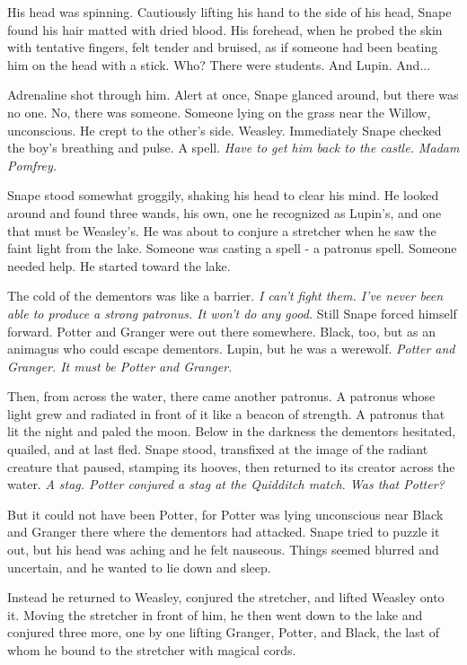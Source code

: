 His head was spinning. Cautiously lifting his hand to the side of his head, Snape found his hair matted with dried blood. His forehead, when he probed the skin with tentative fingers, felt tender and bruised, as if someone had been beating him on the head with a stick. Who? There were students. And Lupin. And...

Adrenaline shot through him. Alert at once, Snape glanced around, but there was no one. No, there was someone. Someone lying on the grass near the Willow, unconscious. He crept to the other's side. Weasley. Immediately Snape checked the boy's breathing and pulse. A spell. \emph{Have to get him back to the castle. Madam Pomfrey.}

Snape stood somewhat groggily, shaking his head to clear his mind. He looked around and found three wands, his own, one he recognized as Lupin's, and one that must be Weasley's. He was about to conjure a stretcher when he saw the faint light from the lake. Someone was casting a spell - a patronus spell. Someone needed help. He started toward the lake.

The cold of the dementors was like a barrier. \emph{I can't fight them. I've never been able to produce a strong patronus. It won't do any good.} Still Snape forced himself forward. Potter and Granger were out there somewhere. Black, too, but as an animagus who could escape dementors. Lupin, but he was a werewolf. \emph{Potter and Granger. It must be Potter and Granger.}

Then, from across the water, there came another patronus. A patronus whose light grew and radiated in front of it like a beacon of strength. A patronus that lit the night and paled the moon. Below in the darkness the dementors hesitated, quailed, and at last fled. Snape stood, transfixed at the image of the radiant creature that paused, stamping its hooves, then returned to its creator across the water. \emph{A stag. Potter conjured a stag at the Quidditch match. Was that Potter?}

But it could not have been Potter, for Potter was lying unconscious near Black and Granger there where the dementors had attacked. Snape tried to puzzle it out, but his head was aching and he felt nauseous. Things seemed blurred and uncertain, and he wanted to lie down and sleep.

Instead he returned to Weasley, conjured the stretcher, and lifted Weasley onto it. Moving the stretcher in front of him, he then went down to the lake and conjured three more, one by one lifting Granger, Potter, and Black, the last of whom he bound to the stretcher with magical cords.

